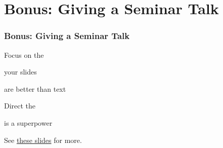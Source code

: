 \section*{Bonus: Giving a Seminar Talk}

\begin{frame}
  \frametitle{Bonus: Giving a Seminar Talk}

  Focus on the 

  \medskip
  \pause

   your slides

  \medskip
  \pause

   are better than text

  \medskip
  \pause

  Direct the 

  \medskip
  \pause

   is a superpower

  \bigskip
  \pause

  See \href{https://docs.google.com/presentation/d/1T-w7SEXwFf3HxRMYF_EnRnAMT1_sfq6TrOwV7R6amHk/edit?usp=sharing}{these slides} for more.
\end{frame}


